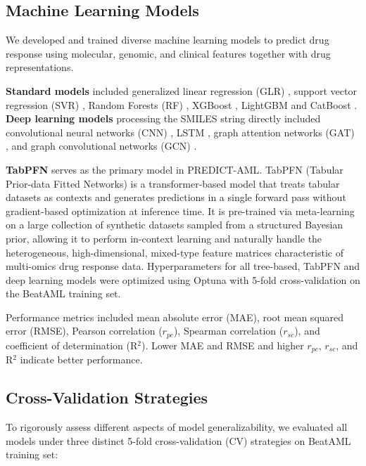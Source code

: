 \documentclass[pdflatex,sn-mathphys-num]{sn-jnl}
\theoremstyle{thmstyleone}
\theoremstyle{thmstyletwo}
\theoremstyle{thmstylethree}
\begin{document}
\subsection{Machine Learning Models}\label{sec2.8}
We developed and trained diverse machine learning models to predict drug response using molecular, genomic, and clinical features together with drug representations.

\textbf{Standard models} included generalized linear regression (GLR) \cite{nelder1972generalized}, support vector regression (SVR) \cite{chandorkar2015fixed}, Random Forests (RF) \cite{breiman2001random}, XGBoost \cite{chen2016xgboost}, LightGBM \cite{ke2017lightgbm} and CatBoost \cite{prokhorenkova2018catboost}. \textbf{Deep learning models} processing the SMILES string directly included convolutional neural networks (CNN) \cite{sermanet2012convolutional}, LSTM \cite{gers2000learning}, graph attention networks (GAT) \cite{velivckovic2017graph}, and graph convolutional networks (GCN) \cite{kipf2017semi}.

\textbf{TabPFN} \cite{hollmann2023tabpfn} serves as the primary model in PREDICT-AML. TabPFN (Tabular Prior-data Fitted Networks) is a transformer-based model that treats tabular datasets as contexts and generates predictions in a single forward pass without gradient-based optimization at inference time. It is pre-trained via meta-learning on a large collection of synthetic datasets sampled from a structured Bayesian prior, allowing it to perform in-context learning and naturally handle the heterogeneous, high-dimensional, mixed-type feature matrices characteristic of multi-omics drug response data. Hyperparameters for all tree-based, TabPFN and deep learning models were optimized using Optuna \cite{akiba2019optuna} with 5-fold cross-validation on the BeatAML training set.

Performance metrics included mean absolute error (MAE), root mean squared error (RMSE), Pearson correlation ($r_{pc}$), Spearman correlation ($r_{sc}$), and coefficient of determination (R$^2$). Lower MAE and RMSE and higher $r_{pc}$, $r_{sc}$, and R$^2$ indicate better performance.

\subsection{Cross-Validation Strategies}\label{sec2.9}
To rigorously assess different aspects of model generalizability, we evaluated all models under three distinct 5-fold cross-validation (CV) strategies on BeatAML training set:
\end{document}
